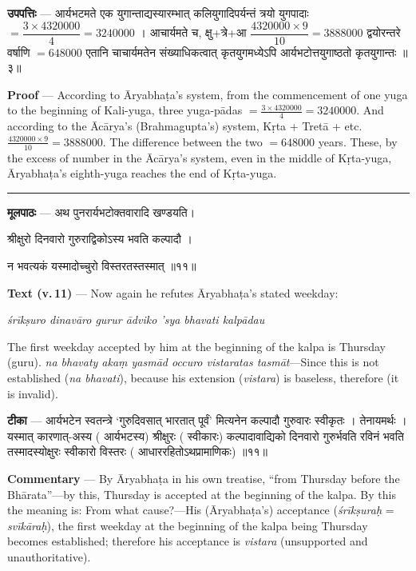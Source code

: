 \documentclass[11pt,a4paper]{article}
\newcommand{\skt}[1]{{\devanagarifont\color{sktcolor} #1}}
\newenvironment{bilingual}{%
  \par\noindent
  \begin{minipage}[t]{0.47\textwidth}%
}{%
  \par\end{minipage}%
}
\newcommand{\rightcol}{%
  \par\end{minipage}%
  \hfill
  \begin{minipage}[t]{0.47\textwidth}%
}
\begin{document}
\medskip

\begin{bilingual}
\textbf{उपपत्तिः} --- \skt{आर्यभटमते एक युगान्ताद्यस्यारम्भात् कलियुगादिपर्यन्तं त्रयो युगपादाः} $= \dfrac{3 \times 4320000}{4} = 3240000$ । \skt{आचार्यमते च, क्षु+त्रे+आ} $\dfrac{4320000 \times 9}{10} = 3888000$ \skt{द्वयोरन्तरे वर्षाणि} $= 648000$ \skt{एतानि चाचार्यमतेन संख्याधिकत्वात् कृतयुगमध्येऽपि आर्यभटोत्तयुगाष्ठतो कृतयुगान्तः} ॥३॥
\rightcol
\textbf{Proof} --- According to Āryabhaṭa's system, from the commencement of one yuga to the beginning of Kali-yuga, three yuga-pādas $= \frac{3 \times 4320000}{4} = 3240000$. And according to the Ācārya's (Brahmagupta's) system, Kṛta + Tretā + etc. $\frac{4320000 \times 9}{10} = 3888000$. The difference between the two $= 648000$ years. These, by the excess of number in the Ācārya's system, even in the middle of Kṛta-yuga, Āryabhaṭa's eighth-yuga reaches the end of Kṛta-yuga.
\end{bilingual}

\medskip
\noindent\rule{\textwidth}{0.4pt}

\begin{bilingual}
\textbf{मूलपाठः} --- \skt{अथ पुनरार्यभटोक्तवारादि खण्डयति}।

\skt{श्रीक्षुरो दिनवारो गुरुराद्विकोऽस्य भवति कल्पादौ} ।

\skt{न भवत्यकं यस्मादोच्चुरो विस्तरतस्तस्मात्} ॥११॥
\rightcol
\textbf{Text (v.\,11)} --- Now again he refutes Āryabhaṭa's stated weekday:

\textit{śrīkṣuro dinavāro gurur ādviko 'sya bhavati kalpādau}

The first weekday accepted by him at the beginning of the kalpa is Thursday (guru). \textit{na bhavaty akaṃ yasmād occuro vistaratas tasmāt}---Since this is not established (\textit{na bhavati}), because his extension (\textit{vistara}) is baseless, therefore (it is invalid).
\end{bilingual}

\medskip

\begin{bilingual}
\textbf{टीका} --- \skt{आर्यभटेन स्वतन्त्रे `गुरुदिवसात् भारतात् पूर्वं' मित्यनेन कल्पादौ गुरुवारः स्वीकृतः । तेनायमर्थः । यस्मात् कारणात्-अस्य} (\skt{आर्यभटस्य}) \skt{श्रीक्षुरः} (\skt{स्वीकारः}) \skt{कल्पादावाद्यिको दिनवारो गुरुर्भवति रविनं भवति तस्मादस्योक्षुरः स्वीकारो विस्तरः} (\skt{आधाररहितोऽथप्रामाणिकः}) ॥११॥
\rightcol
\textbf{Commentary} --- By Āryabhaṭa in his own treatise, ``from Thursday before the Bhārata''---by this, Thursday is accepted at the beginning of the kalpa. By this the meaning is: From what cause?---His (Āryabhaṭa's) acceptance (\textit{śrīkṣuraḥ} = \textit{svīkāraḥ}), the first weekday at the beginning of the kalpa being Thursday becomes established; therefore his acceptance is \textit{vistara} (unsupported and unauthoritative).
\end{bilingual}
\end{document}
